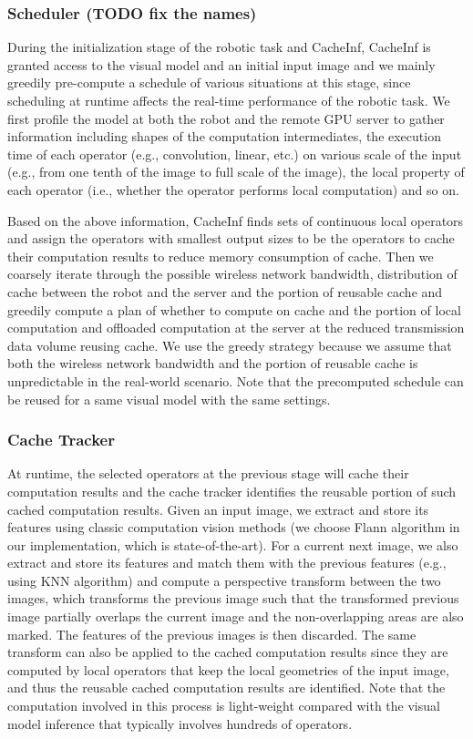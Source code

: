 \subsubsection{Scheduler (TODO fix the names)}
During the initialization stage of the robotic task and CacheInf, CacheInf is granted access to the visual model and an initial input image and we mainly greedily pre-compute a schedule of various situations at this stage, since scheduling at runtime affects the real-time performance of the robotic task.
We first profile the model at both the robot and the remote GPU server to gather information  including shapes of the computation intermediates, the execution time of each operator (e.g., convolution, linear, etc.) on various scale of the input (e.g., from one tenth of the image to full scale of the image), the local property of each operator (i.e., whether the operator performs local computation) and so on.

Based on the above information, CacheInf finds sets of continuous local operators and assign the operators with smallest output sizes to be the operators to cache their computation results to reduce memory consumption of cache.
Then we coarsely iterate through the possible wireless network bandwidth, distribution of cache between the robot and the server and the portion of reusable cache and greedily compute a plan of whether to compute on cache and the portion of local computation and offloaded computation at the server at the reduced transmission data volume reusing cache.
We use the greedy strategy because we assume that both the wireless network bandwidth and the portion of reusable cache is unpredictable in the real-world scenario.
Note that the precomputed schedule can be reused for a same visual model with the same settings. 

\subsubsection{Cache Tracker}
At runtime, the selected operators at the previous stage will cache their computation results and the cache tracker identifies the reusable portion of such cached computation results.
Given an input image, we extract and store its features using classic computation vision methods (we choose Flann algorithm in our implementation, which is state-of-the-art).
For a current next image, we also extract and store its features and match them with the previous features (e.g., using KNN algorithm) and compute a perspective transform between the two images, which transforms the previous image such that the transformed previous image partially overlaps the current image and the non-overlapping areas are also marked.
The features of the previous images is then discarded.
The same transform can also be applied to the cached computation results since they are computed by local operators that keep the local geometries of the input image, and thus the reusable cached computation results are identified.
Note that the computation involved in this process is light-weight compared with the visual model inference that typically involves hundreds of operators.


